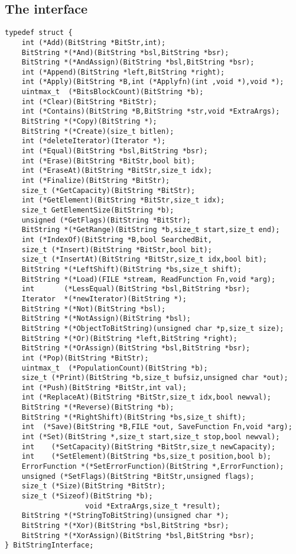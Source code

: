\documentclass[12pt,a4paper]{memoir} %
\begin{document}
{{\subsection{The interface}
\begin{verbatim}
typedef struct {
    int (*Add)(BitString *BitStr,int);
    BitString *(*And)(BitString *bsl,BitString *bsr);
    BitString *(*AndAssign)(BitString *bsl,BitString *bsr);
    int (*Append)(BitString *left,BitString *right);
    int (*Apply)(BitString *B,int (*Applyfn)(int ,void *),void *);
    uintmax_t  (*BitsBlockCount)(BitString *b);
    int (*Clear)(BitString *BitStr);
    int (*Contains)(BitString *B,BitString *str,void *ExtraArgs);
    BitString *(*Copy)(BitString *);
    BitString *(*Create)(size_t bitlen);
    int (*deleteIterator)(Iterator *);
    int (*Equal)(BitString *bsl,BitString *bsr);
    int (*Erase)(BitString *BitStr,bool bit);
    int (*EraseAt)(BitString *BitStr,size_t idx);
    int (*Finalize)(BitString *BitStr);
    size_t (*GetCapacity)(BitString *BitStr);
    int (*GetElement)(BitString *BitStr,size_t idx);
    size_t GetElementSize(BitString *b);
    unsigned (*GetFlags)(BitString *BitStr);
    BitString *(*GetRange)(BitString *b,size_t start,size_t end);
    int (*IndexOf)(BitString *B,bool SearchedBit,
    size_t (*Insert)(BitString *BitStr,bool bit);
    size_t (*InsertAt)(BitString *BitStr,size_t idx,bool bit);
    BitString *(*LeftShift)(BitString *bs,size_t shift);
    BitString *(*Load)(FILE *stream, ReadFunction Fn,void *arg);
    int       (*LessEqual)(BitString *bsl,BitString *bsr);
    Iterator  *(*newIterator)(BitString *);
    BitString *(*Not)(BitString *bsl);
    BitString *(*NotAssign)(BitString *bsl);
    BitString *(*ObjectToBitString)(unsigned char *p,size_t size);
    BitString *(*Or)(BitString *left,BitString *right);
    BitString *(*OrAssign)(BitString *bsl,BitString *bsr);
    int (*Pop)(BitString *BitStr);
    uintmax_t  (*PopulationCount)(BitString *b);
    size_t (*Print)(BitString *b,size_t bufsiz,unsigned char *out);
    int (*Push)(BitString *BitStr,int val);
    int (*ReplaceAt)(BitString *BitStr,size_t idx,bool newval);
    BitString *(*Reverse)(BitString *b);
    BitString *(*RightShift)(BitString *bs,size_t shift);
    int  (*Save)(BitString *B,FILE *out, SaveFunction Fn,void *arg);
    int (*Set)(BitString *,size_t start,size_t stop,bool newval);
    int    (*SetCapacity)(BitString *BitStr,size_t newCapacity);
    int    (*SetElement)(BitString *bs,size_t position,bool b);
    ErrorFunction *(*SetErrorFunction)(BitString *,ErrorFunction);
    unsigned (*SetFlags)(BitString *BitStr,unsigned flags);
    size_t (*Size)(BitString *BitStr);
    size_t (*Sizeof)(BitString *b);
                   void *ExtraArgs,size_t *result);
    BitString *(*StringToBitString)(unsigned char *);
    BitString *(*Xor)(BitString *bsl,BitString *bsr);
    BitString *(*XorAssign)(BitString *bsl,BitString *bsr);
} BitStringInterface;
\end{verbatim}
}}
\end{document}
